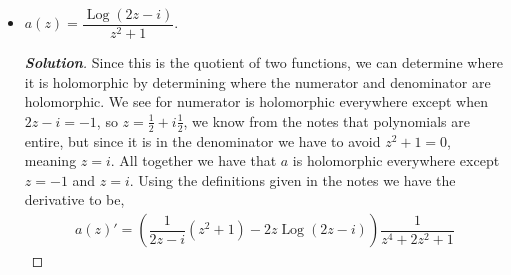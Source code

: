 \documentclass[11pt]{article}
\newenvironment{problem}[2][Problem\!]{\begin{trivlist}
\item[\hskip \labelsep {\bfseries #1}\hskip \labelsep {\bfseries #2}]}{\end{trivlist}}
\newenvironment{solution}{\begin{proof}[\textbf{\textit{Solution}}] }{\end{proof}}
\newcommand{\plog}{\operatorname{Log}}
\newcommand{\lrp}[1]{\left(#1\right)}
\begin{document}
\begin{problem}{5.4}
\begin{itemize}[itemsep=3em]
\item[(c)] $a(z) = \dfrac{\plog(2z - i)}{z^2 + 1}$.
\begin{solution}
  Since this is the quotient of two functions, we can determine where it is holomorphic by determining where the numerator and denominator are holomorphic. We see for numerator is holomorphic everywhere except when $2z - i = -1$, so $z = \frac{1}{2} + i \frac{1}{2}$, we know from the notes that polynomials are entire, but since it is in the denominator we have to avoid $z^{2} + 1 = 0$, meaning $z = i$. All together we have that $a$ is holomorphic everywhere except $z = -1$ and $z = i$. Using the definitions given in the notes we have the derivative to be,
  \begin{align*}
    a(z)' = \lrp{\dfrac{1}{2z - i}(z^{2} + 1) - 2z\plog(2z -i)}\dfrac{1}{z^{4}+ 2z^{2} + 1}
  \end{align*}
\end{solution}

\end{itemize}
\end{problem}

\newpage  %
\end{document}
